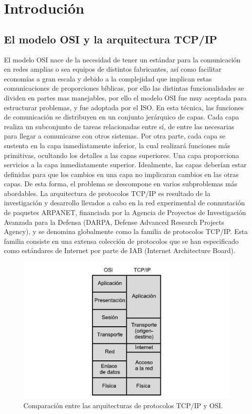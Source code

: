 \section{Introduci\'on}
	\subsection{El modelo OSI y la arquitectura TCP/IP}
		\setlength{\parindent}{1em}
		\setlength{\parskip}{10pt}
			El modelo OSI nace de la necesidad de tener un est\'andar para la comunicaci\'on en redes amplias o sea equipos de distintos fabricantes, as\'i como facilitar econom\'ias a gran escala y debido a la complejidad que implican estas comunicaciones de proporciones b\'iblicas, por ello las distintas funcionalidades se dividen en partes mas manejables, por ello el modelo OSI fue muy aceptada para estructurar problemas, y fue adoptada por el ISO. En esta t\'ecnica, las funciones de comunicaci\'on se distribuyen en un conjunto jer\'arquico de capas. Cada capa realiza un subconjunto de tareas relacionadas entre s\'i, de entre las necesarias para llegar a comunicarse con otros sistemas. Por otra parte, cada capa se sustenta en la capa inmediatamente inferior, la cual realizar\'a funciones m\'as primitivas, ocultando los detalles a las capas superiores. Una capa proporciona servicios a la capa inmediatamente superior. Idealmente, las capas deber\'ian estar definidas para que los cambios en una capa no implicaran cambios en las otras capas. De esta forma, el problema se descompone en varios subproblemas m\'as abordables.
\vskip 1pt
La arquitectura de protocolos TCP/IP es resultado de la investigaci\'on y desarrollo llevados a cabo en la red experimental de conmutaci\'on de paquetes ARPANET, financiada por la Agencia de Proyectos de Investigaci\'on Avanzada para la Defensa (DARPA, Defense Advanced Research Projects Agency), y se denomina globalmente como la familia de protocolos TCP/IP. Esta familia consiste en una extensa colecci\'on de protocolos que se han especificado como est\'andares de Internet por parte de IAB (Internet Architecture Board).
\begin{figure}[h]
			\centering		
			\includegraphics[width=\textwidth]{OSITCP}
			\caption{Comparaci\'on entre las arquitecturas de protocolos TCP/IP y OSI.}
		\end{figure}
		\clearpage
